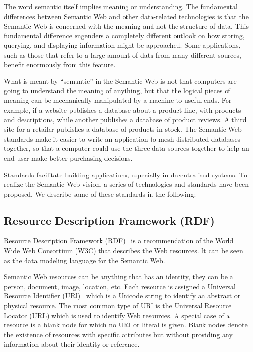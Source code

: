 The word semantic itself implies meaning or understanding. The fundamental differences between Semantic Web and other data-related technologies is that the Semantic Web is concerned with the meaning and not the structure of data. This fundamental difference engenders a completely different outlook on how storing, querying, and displaying information might be approached.  Some applications, such as those that refer to a large amount of data from many different sources, benefit enormously from this feature.

What is meant by ``semantic'' in the Semantic Web is not that computers are going to understand the meaning of anything, but that the logical pieces of meaning can be mechanically manipulated by a machine to useful ends. For example, if a website publishes a database about a product line, with products and descriptions, while another publishes a database of product reviews. A third site for a retailer publishes a database of products in stock. The Semantic Web standards make it easier to write an application to mesh distributed databases together, so that a computer could use the three data sources together to help an end-user make better purchasing decisions.

Standards facilitate building applications, especially in decentralized systems. To realize the Semantic Web vision, a series of technologies and standards have been proposed. We describe some of these standards in the following:

\subsection{Resource Description Framework (RDF)}
Resource Description Framework (RDF)~\cite{Lassila:RDF:99} is a recommendation of the World Wide Web Consortium (W3C) that describes the Web resources. It can be seen as the data modeling language for the Semantic Web.

Semantic Web resources can be anything that has an identity, they can be a person, document, image, location, etc. Each resource is assigned a Universal Resource Identifier (URI)~\cite{Berners:RFC:05} which is a Unicode string to identify an abstract or physical resource. The most common type of URI is the Universal Resource Locator (URL) which is used to identify Web resources. A special case of a resource is a blank node for which no URI or literal is given. Blank nodes denote the existence of resources with specific attributes but without providing any information about their identity or reference.

